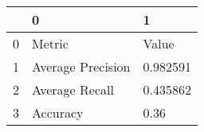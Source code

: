 \begin{tabular}{lll}
\toprule
{} &                  0 &         1 \\
\midrule
0 &             Metric &     Value \\
1 &  Average Precision &  0.982591 \\
2 &     Average Recall &  0.435862 \\
3 &           Accuracy &      0.36 \\
\bottomrule
\end{tabular}
